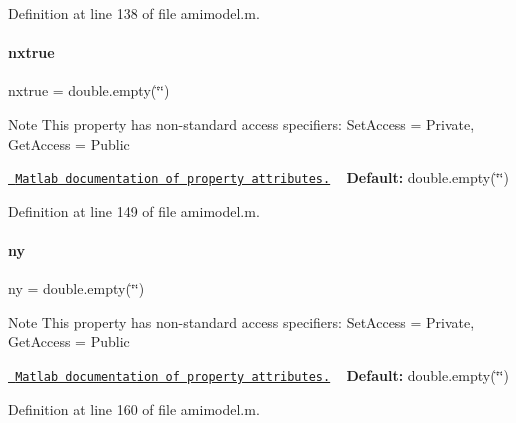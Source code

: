 Definition at line 138 of file amimodel.\+m.

\mbox{\label{classamimodel_a49c476de14a021114feb8c95da04952a}} 
\paragraph{\texorpdfstring{nxtrue}{nxtrue}}
{\footnotesize\ttfamily nxtrue = double.\+empty(\char`\"{}\char`\"{})}

\begin{DoxyNote}{Note}
This property has non-\/standard access specifiers\+: {\ttfamily Set\+Access = Private, Get\+Access = Public} 

\href{http://www.mathworks.com/help/matlab/matlab_oop/property-attributes.html}{\texttt{ Matlab documentation of property attributes.}} ~\newline
{\bfseries{Default\+:}} double.\+empty(\char`\"{}\char`\"{}) 
\end{DoxyNote}


Definition at line 149 of file amimodel.\+m.

\mbox{\label{classamimodel_a289ca425eb368f1d582b6be2be0d3dfc}} 
\paragraph{\texorpdfstring{ny}{ny}}
{\footnotesize\ttfamily ny = double.\+empty(\char`\"{}\char`\"{})}

\begin{DoxyNote}{Note}
This property has non-\/standard access specifiers\+: {\ttfamily Set\+Access = Private, Get\+Access = Public} 

\href{http://www.mathworks.com/help/matlab/matlab_oop/property-attributes.html}{\texttt{ Matlab documentation of property attributes.}} ~\newline
{\bfseries{Default\+:}} double.\+empty(\char`\"{}\char`\"{}) 
\end{DoxyNote}


Definition at line 160 of file amimodel.\+m.

\mbox{\label{classamimodel_ac91d7b36031ec122abc9f739692b02e8}} 
